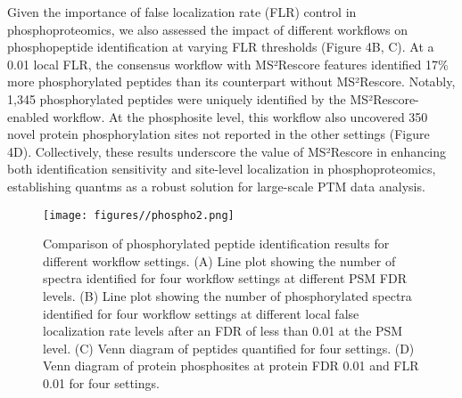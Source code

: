 \documentclass[12pt]{article}
\begin{document}
Given the importance of false localization rate (FLR) control in phosphoproteomics, we also assessed the impact of different workflows on phosphopeptide identification at varying FLR thresholds (Figure 4B, C). At a 0.01 local FLR, the consensus workflow with MS²Rescore features identified 17\% more phosphorylated peptides than its counterpart without MS²Rescore. Notably, 1,345 phosphorylated peptides were uniquely identified by the MS²Rescore-enabled workflow. At the phosphosite level, this workflow also uncovered 350 novel protein phosphorylation sites not reported in the other settings (Figure 4D). Collectively, these results underscore the value of MS²Rescore in enhancing both identification sensitivity and site-level localization in phosphoproteomics, establishing quantms as a robust solution for large-scale PTM data analysis. %

\begin{figure}[ht!]
	\centering
	\texttt{[image: figures//phospho2.png]}
	\caption{Comparison of phosphorylated peptide identification results for different workflow settings. (A) Line plot showing the number of spectra identified for four workflow settings at different PSM FDR levels. (B) Line plot showing the number of phosphorylated spectra identified for four workflow settings at different local false localization rate levels after an FDR of less than 0.01 at the PSM level. (C) Venn diagram of peptides quantified for four settings. (D) Venn diagram of protein phosphosites at protein FDR 0.01 and FLR 0.01 for four settings.} %
	\label{fig:PXD026824_ms2rescore}
\end{figure}
\end{document}
